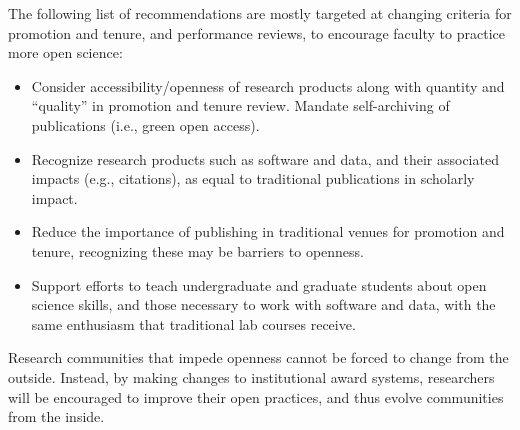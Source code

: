 \documentclass[nobib]{tufte-handout}
\begin{document}
The following list of recommendations are mostly targeted at changing criteria
for promotion and tenure, and performance reviews, to encourage faculty to
practice more open science:
\begin{itemize}
    \item Consider accessibility\slash openness of research products along
    with quantity and ``quality'' in promotion and tenure review. Mandate
    self-archiving of publications (i.e., green open access).

    \item Recognize research products such as software and data, and their
    associated impacts (e.g., citations), as equal to traditional
    publications in scholarly impact.

    \item Reduce the importance of publishing in traditional venues for promotion
    and tenure, recognizing these may be barriers to openness.

    \item Support efforts to teach undergraduate and graduate students about
    open science skills, and those necessary to work with software and data, with
    the same enthusiasm that traditional lab courses receive.
\end{itemize}
Research communities that impede openness cannot be forced to change from the
outside. Instead, by making changes to institutional award systems, researchers
will be encouraged to improve their open practices, and thus evolve communities
from the inside.

%
%
\printbibliography
\end{document}
